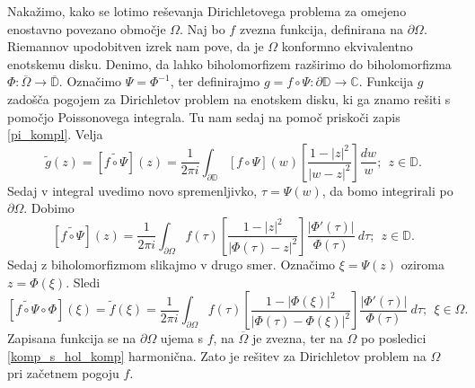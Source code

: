 \documentclass[mat1, tisk]{fmfdelo}
\begin{document}
    Nakažimo, kako se lotimo reševanja Dirichletovega problema za omejeno enostavno povezano območje $\Omega$. Naj bo $f$ zvezna funkcija, definirana na $\partial \Omega$. 
    Riemannov upodobitven izrek nam pove, da je $\Omega$ konformno ekvivalentno enotskemu disku. Denimo, da lahko biholomorfizem razširimo do biholomorfizma $\Phi: \overline{\Omega} \to \overline{\mathbb{D}}$. 
    Označimo $\Psi = \Phi^{-1}$, ter definirajmo $g = f \circ \Psi: \partial \mathbb{D} \to \mathbb{C}$. Funkcija $g$ zadošča pogojem za Dirichletov problem na enotskem disku, ki ga znamo rešiti s pomočjo Poissonovega integrala. 
    Tu nam sedaj na pomoč priskoči zapis \eqref{pi_kompl}. Velja
    $$
    \widetilde{g}(z) = [\widetilde{f \circ \Psi}](z) = \frac{1}{2\pi i}\int_{\partial \mathbb{D}}{[f \circ \Psi](w) \left[\frac{1 - |z|^2}{|w - z|^2}\right]\frac{dw}{w}};~~z \in \mathbb{D}. 
    $$
    Sedaj v integral uvedimo novo spremenljivko, $\tau = \Psi(w)$, da bomo integrirali po $\partial \Omega$. Dobimo
    $$
    [\widetilde{f \circ \Psi}](z) = \frac{1}{2\pi i}\int_{\partial \Omega}{f(\tau) \left[\frac{1 - |z|^2}{|\Phi(\tau) - z|^2}\right]\frac{|\Phi'(\tau)|}{\Phi(\tau)}~d \tau};~~z \in \mathbb{D}. 
    $$
    Sedaj z biholomorfizmom slikajmo v drugo smer. Označimo $\xi = \Psi(z)$ oziroma $z = \Phi(\xi)$. Sledi
    \begin{equation}
        \label{eno_pov_obm}
        [\widetilde{f \circ \Psi} \circ \Phi](\xi) = \widetilde{f}(\xi) = \frac{1}{2\pi i}\int_{\partial \Omega}{f(\tau) \left[\frac{1 - |\Phi(\xi)|^2}{|\Phi(\tau) - \Phi(\xi)|^2}\right]\frac{|\Phi'(\tau)|}{\Phi(\tau)}~d \tau};~~\xi \in \Omega. 
    \end{equation}
    Zapisana funkcija se na $\partial \Omega$ ujema s $f$, na $\overline{\Omega}$ je zvezna, ter na $\Omega$ po posledici \ref{komp_s_hol_komp} harmonična. Zato je rešitev za Dirichletov problem na $\Omega$ pri začetnem pogoju $f$.
\end{document}
